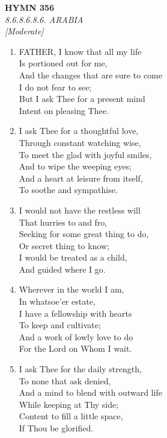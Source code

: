 \newpage
\begin{center}
    {\Large \textbf{HYMN 356}}
    \\
    \textit{8.6.8.6.8.6. ARABIA}
    \\
    \textit{\small [Moderate]}
\end{center}
\vspace{1em}

\begin{enumerate}
    \item FATHER, I know that all my life \\
        Is portioned out for me, \\
        And the changes that are sure to come \\
        I do not fear to see; \\
        But I ask Thee for a present mind \\
        Intent on pleasing Thee.

    \item I ask Thee for a thoughtful love, \\
        Through constant watching wise, \\
        To meet the glad with joyful smiles, \\
        And to wipe the weeping eyes; \\
        And a heart at leisure from itself, \\
        To soothe and sympathise.

    \item I would not have the restless will \\
        That hurries to and fro, \\
        Seeking for some great thing to do, \\
        Or secret thing to know; \\
        I would be treated as a child, \\
        And guided where I go.

    \item Wherever in the world I am, \\
        In whatsoe'er estate, \\
        I have a fellowship with hearts \\
        To keep and cultivate; \\
        And a work of lowly love to do \\
        For the Lord on Whom I wait.

    \item I ask Thee for the daily strength, \\
        To none that ask denied, \\
        And a mind to blend with outward life \\
        While keeping at Thy side; \\
        Content to fill a little space, \\
        If Thou be glorified.


\end{enumerate}
